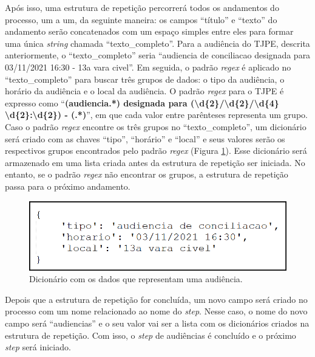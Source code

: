 Após isso, uma estrutura de repetição percorrerá todos os andamentos do processo, um a um, da seguinte maneira: os campos \enquote{título} e \enquote{texto} do andamento serão concatenados com um espaço simples entre eles para formar uma única \textit{string} chamada \enquote{texto\_completo}. Para a audiência do TJPE, descrita anteriormente, o \enquote{texto\_completo} seria \enquote{audiencia de conciliacao designada para 03/11/2021 16:30 - 13a vara civel}. Em seguida, o padrão \textit{regex} é aplicado no \enquote{texto\_completo} para buscar três grupos de dados: o tipo da audiência, o horário da audiência e o local da audiência. O padrão \textit{regex} para o TJPE é expresso como \enquote{\textbf{(audiencia.*) designada para (\textbackslash d\{2\}/\textbackslash d\{2\}/\textbackslash d\{4\} \textbackslash d\{2\}:\textbackslash d\{2\}) - (.*)}}, em que cada valor entre parênteses representa um grupo. Caso o padrão \textit{regex} encontre os três grupos no \enquote{texto\_completo}, um dicionário será criado com as chaves \enquote{tipo}, \enquote{horário} e \enquote{local} e seus valores serão os respectivos grupos encontrados pelo padrão \textit{regex} (Figura \ref{fig:dictAudiencia}). Esse dicionário será armazenado em uma lista criada antes da estrutura de repetição ser iniciada. No entanto, se o padrão \textit{regex} não encontrar os grupos, a estrutura de repetição passa para o próximo andamento.

\begin{figure}[ht]
\centering
\includegraphics[width=.8\textwidth]{imagens/audiencia.png}
\caption{Dicionário com os dados que representam uma audiência.}
\label{fig:dictAudiencia}
\end{figure}

Depois que a estrutura de repetição for concluída, um novo campo será criado no processo com um nome relacionado ao nome do \textit{step}. Nesse caso, o nome do novo campo será \enquote{audiencias} e o seu valor vai ser a lista com os dicionários criados na estrutura de repetição. Com isso, o \textit{step} de audiências é concluído e o próximo \textit{step} será iniciado.


